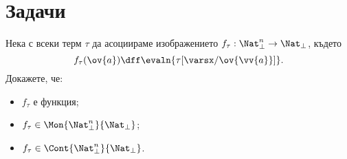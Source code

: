 \section{Задачи}

\begin{problem}
  Нека с всеки терм $\tau$ да асоциираме изображението $f_\tau:\Nat^n_\bot \to \Nat_\bot$,
  където 
  \[f_\tau(\ov{a}) \dff \evaln{\tau[\varsx/\ov{\vv{a}}]}.\]
  Докажете, че:
  \begin{itemize}
  \item 
    $f_\tau$ е функция;
  \item
    $f_\tau \in \Mon{\Nat^n_\bot}{\Nat_\bot}$;
  \item
    $f_\tau \in \Cont{\Nat^n_\bot}{\Nat_\bot}$.
  \end{itemize}

\end{problem}

